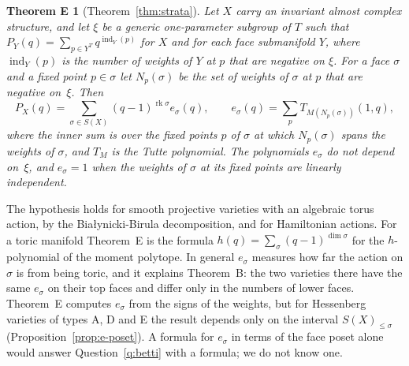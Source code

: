 \documentclass[11pt,a4paper]{article}
\numberwithin{equation}{section}
\theoremstyle{plain}
\newtheorem*{theoremE}{Theorem E}
\theoremstyle{definition}
\theoremstyle{remark}
\DeclareMathOperator{\rk}{rk}
\DeclareMathOperator{\ind}{ind}
\begin{document}
\begin{theoremE}[Theorem~\ref{thm:strata}]
Let $X$ carry an invariant almost complex structure, and let $\xi$ be a generic one-parameter subgroup of $T$ such that $P_Y(q)=\sum_{p\in Y^T}q^{\ind_Y(p)}$ for $X$ and for each face submanifold $Y$, where $\ind_Y(p)$ is the number of weights of $Y$ at $p$ that are negative on $\xi$. For a face $\sigma$ and a fixed point $p\in\sigma$ let $N_p(\sigma)$ be the set of weights of $\sigma$ at $p$ that are negative on~$\xi$. Then
\[
P_X(q)=\sum_{\sigma\in S(X)}(q-1)^{\rk\sigma}e_\sigma(q),\qquad e_\sigma(q)=\sum_pT_{M(N_p(\sigma))}(1,q),
\]
where the inner sum is over the fixed points $p$ of $\sigma$ at which $N_p(\sigma)$ spans the weights of $\sigma$, and $T_M$ is the Tutte polynomial. The polynomials $e_\sigma$ do not depend on~$\xi$, and $e_\sigma=1$ when the weights of $\sigma$ at its fixed points are linearly independent.
\end{theoremE}

The hypothesis holds for smooth projective varieties with an algebraic torus action, by the Białynicki-Birula decomposition, and for Hamiltonian actions. For a toric manifold Theorem~E is the formula $h(q)=\sum_\sigma(q-1)^{\dim\sigma}$ for the $h$-polynomial of the moment polytope. In general $e_\sigma$ measures how far the action on $\sigma$ is from being toric, and it explains Theorem~B: the two varieties there have the same $e_\sigma$ on their top faces and differ only in the numbers of lower faces. Theorem~E computes $e_\sigma$ from the signs of the weights, but for Hessenberg varieties of types A, D and E the result depends only on the interval $S(X)_{\leqslant\sigma}$ (Proposition~\ref{prop:e-poset}). A formula for $e_\sigma$ in terms of the face poset alone would answer Question~\ref{q:betti} with a formula; we do not know one.
\end{document}
